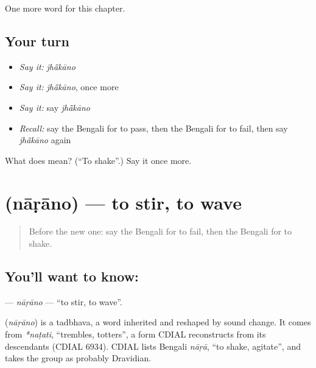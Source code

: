 \begin{grammarlens}[title={What you've built}]
One more word for this chapter.
\end{grammarlens}

\subsection*{Your turn}
\begin{itemize}
\raggedright
  \item \emph{Say it:} \emph{jhā̃kāno}
  \item \emph{Say it:} \emph{jhā̃kāno}, once more
  \item \emph{Say it:} say \emph{jhā̃kāno}
  \item \emph{Recall:} say the Bengali for to pass, then the Bengali for to fail, then say \emph{jhā̃kāno} again
\end{itemize}

\begin{tcolorbox}[breakable,colback=teal!4,colframe=teal!35!black,title={Before you move on}]
What does  mean? (\textquotedblleft{}To shake\textquotedblright{}.) Say it once more.
\end{tcolorbox}
\section[\texorpdfstring{\bn{নাড়ানো} (nāṛāno)}{নাড়ানো (nāṛāno)}]{ (nāṛāno) — to stir, to wave}

\label{lesson:BN-C214-narano}



\begin{quote}
Before the new one: say the Bengali for to fail, then the Bengali for to shake.
\end{quote}

\subsection*{You'll want to know: }
\textbf{} — \emph{nāṛāno} — \textquotedblleft{}to stir, to wave\textquotedblright{}.

\begin{cousinweb}
\textbf{} (\emph{nāṛāno}) is a tadbhava, a word inherited and reshaped by sound change. It comes from \emph{*naṭati}, \textquotedblleft{}trembles, totters\textquotedblright{}, a form CDIAL reconstructs from its descendants (CDIAL 6934). CDIAL lists Bengali \emph{nāṛā}, \textquotedblleft{}to shake, agitate\textquotedblright{}, and takes the group as probably Dravidian.
\end{cousinweb}

